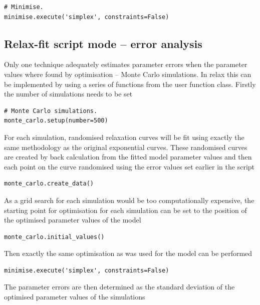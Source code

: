 \begin{lstlisting}[firstnumber=65]
# Minimise.
minimise.execute('simplex', constraints=False)
\end{lstlisting}




\subsection{Relax-fit script mode -- error analysis}

Only one technique adequately estimates parameter errors when the parameter values where found by optimisation -- Monte Carlo simulations.
In relax this can be implemented by using a series of functions from the  user function class.
Firstly the number of simulations needs to be set

\begin{lstlisting}[firstnumber=68]
# Monte Carlo simulations.
monte_carlo.setup(number=500)
\end{lstlisting}

For each simulation, randomised relaxation curves will be fit using exactly the same methodology as the original exponential curves.
These randomised curves are created by back calculation from the fitted model parameter values and then each point on the curve randomised using the error values set earlier in the script

\begin{lstlisting}[firstnumber=70]
monte_carlo.create_data()
\end{lstlisting}

As a grid search for each simulation would be too computationally expensive, the starting point for optimisation for each simulation can be set to the position of the optimised parameter values of the model

\begin{lstlisting}[firstnumber=71]
monte_carlo.initial_values()
\end{lstlisting}

Then exactly the same optimisation as was used for the model can be performed

\begin{lstlisting}[firstnumber=72]
minimise.execute('simplex', constraints=False)
\end{lstlisting}

The parameter errors are then determined as the standard deviation of the optimised parameter values of the simulations


